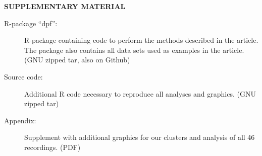\documentclass[12pt]{article}
\begin{document}
\bigskip
\begin{center}
{\large\bf SUPPLEMENTARY MATERIAL}
\end{center}

\begin{description}

\item[R-package ``dpf'':] R-package containing code to perform the
  methods described in the article. The package also contains all data
  sets used as examples in the article. (GNU zipped tar, also on
  Github)
  
\item[Source code:] Additional R code necessary to reproduce all
  analyses and graphics. (GNU zipped tar)

\item[Appendix:] Supplement with additional graphics for our clusters
  and analysis of all 46 recordings. (PDF)

\end{description}






\end{document}
